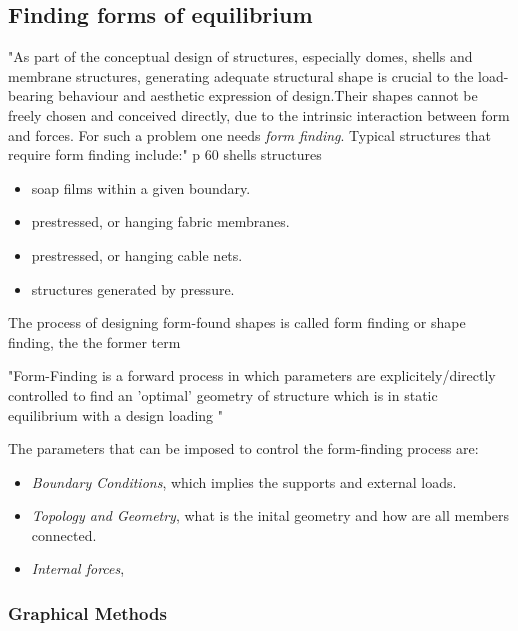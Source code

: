 \subsection{Finding forms of equilibrium}

"As part of the conceptual design of structures, especially domes, shells and membrane structures, generating adequate structural shape is crucial to the load-bearing behaviour and aesthetic  expression of design.Their shapes cannot be freely chosen and conceived directly, due to the intrinsic interaction between form and forces. For such a problem one needs \textit{form finding}. Typical structures that require form finding include:" p 60 shells structures

\begin{itemize}
\item soap films within a given boundary.
\item prestressed, or hanging fabric membranes.
\item prestressed, or hanging cable nets.
\item structures generated by pressure.
\end{itemize}

The process of designing form-found shapes is called form finding or shape finding, the the former term

"Form-Finding is a forward process in which parameters are explicitely/directly controlled to find an 'optimal' geometry of structure which is in static equilibrium with a design loading "

The parameters that can be imposed to control the form-finding process are:

\begin{itemize}
\item \textit{Boundary Conditions}, which implies the supports and external loads.
\item \textit{Topology and Geometry}, what is the inital geometry and how are all members connected.
\item \textit{Internal forces}, 
\end{itemize}


\subsubsection{Graphical Methods}




